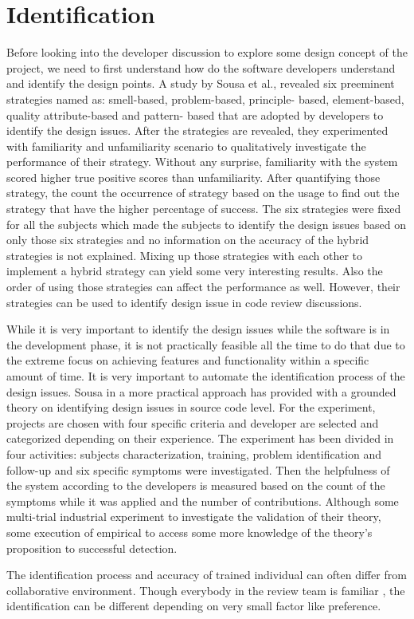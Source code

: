 \section{Identification}
\label{sect:identification}

Before looking into the developer discussion to explore some design concept of the project, we need to first understand how do the software developers understand and identify the design points. A study by Sousa et al.,\cite{Sousa2017} revealed six preeminent strategies named as: smell-based, problem-based, principle- based, element-based, quality attribute-based and pattern- based that are adopted by developers to identify the design issues. After the strategies are revealed, they experimented with familiarity and unfamiliarity scenario to qualitatively investigate the performance of their strategy. Without any surprise, familiarity with the system scored higher true positive scores than unfamiliarity. After quantifying those strategy, the count the occurrence of strategy based on the usage to find out the strategy that have the higher percentage of success. The six strategies were fixed for all the subjects which made the subjects to identify the design issues based on only those six strategies and no information on the accuracy of the hybrid strategies is not explained. Mixing up those strategies with each other to implement a hybrid strategy can yield some very interesting results. Also the order of using those strategies can affect the performance as well. However, their strategies can be used to identify design issue in code review discussions.

        
While it is very important to identify the design issues while the software is in the development phase, it is not practically feasible all the time to do that due to the extreme focus on achieving features and functionality within a specific amount of time. It is very important to automate the identification process of the design issues. Sousa in a more practical approach \cite{Sousa2018} has provided with a grounded theory on identifying design issues in source code level. For the experiment, projects are chosen with four specific criteria and developer are selected and categorized depending on their experience. The experiment has been divided in four activities: subjects characterization, training, problem identification and follow-up and six specific symptoms were investigated. Then the helpfulness of the system according to the developers is measured based on the count of the symptoms while it was applied and the number of contributions. Although some multi-trial industrial experiment to investigate the validation of their theory, some execution of empirical to access some more knowledge of the theory's proposition to successful detection.

The identification process and accuracy of trained individual can often differ from collaborative environment. Though everybody in the review team is familiar \cite{Sousa2017}, the identification can be different depending on very small factor like preference.    